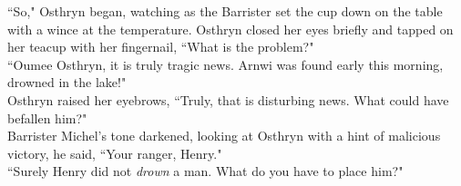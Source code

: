 ``So," Osthryn began, watching as the Barrister set the cup down on the table with a wince at the temperature. 
Osthryn closed her eyes briefly and tapped on her teacup with her fingernail, ``What is the problem?"\\

``Oumee Osthryn, it is truly tragic news. Arnwi was found early this morning, drowned in the lake!"\\
Osthryn raised her eyebrows, ``Truly, that is disturbing news. What could have befallen him?"\\
Barrister Michel's tone darkened, looking at Osthryn with a hint of malicious victory, he said, ``Your ranger, Henry."\\
``Surely Henry did not \textit{drown} a man. What do you have to place him?"\\

